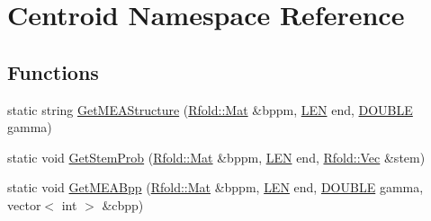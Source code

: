 \hypertarget{namespace_centroid}{\section{Centroid Namespace Reference}
\label{namespace_centroid}
}
\subsection*{Functions}
\begin{DoxyCompactItemize}
\item 
static string \hyperlink{namespace_centroid_a2472e4e4f8b057695c4dc82a1296a750}{Get\+M\+E\+A\+Structure} (\hyperlink{namespace_rfold_a6392dbfbc164230455fdcdb1a0ff53d7}{Rfold\+::\+Mat} \&bppm, \hyperlink{energy__const_8hh_a05b49c662c073f89e86804f7856622a0}{L\+E\+N} end, \hyperlink{energy__const_8hh_a8747af38b86aa2bbcda2f1b1aa0888c2}{D\+O\+U\+B\+L\+E} gamma)
\item 
static void \hyperlink{namespace_centroid_a1536a120dbc969d6a6702ae758427555}{Get\+Stem\+Prob} (\hyperlink{namespace_rfold_a6392dbfbc164230455fdcdb1a0ff53d7}{Rfold\+::\+Mat} \&bppm, \hyperlink{energy__const_8hh_a05b49c662c073f89e86804f7856622a0}{L\+E\+N} end, \hyperlink{namespace_rfold_aaf02f2c0c40c1dd572dbdd8bc1bde67d}{Rfold\+::\+Vec} \&stem)
\item 
static void \hyperlink{namespace_centroid_a4bed069b4230a7f988bf8ed45b96a605}{Get\+M\+E\+A\+Bpp} (\hyperlink{namespace_rfold_a6392dbfbc164230455fdcdb1a0ff53d7}{Rfold\+::\+Mat} \&bppm, \hyperlink{energy__const_8hh_a05b49c662c073f89e86804f7856622a0}{L\+E\+N} end, \hyperlink{energy__const_8hh_a8747af38b86aa2bbcda2f1b1aa0888c2}{D\+O\+U\+B\+L\+E} gamma, vector$<$ int $>$ \&cbpp)
\end{DoxyCompactItemize}


